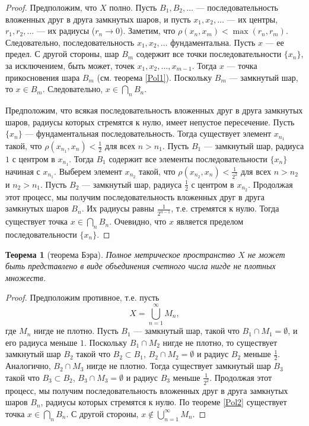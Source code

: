 \documentclass[12pt, titlepage, oneside]{amsbook}
\newtheorem{theorem}{Теорема}[chapter]
\theoremstyle{definition}
\theoremstyle{remark}
\begin{document}
\begin{proof}
Предположим, что $X$ полно. Пусть $B_1, B_2,\ldots$ --- последовательность вложенных друг в друга замкнутых шаров, и пусть $x_1,x_2,\ldots$ --- их центры, $r_1,r_2,\ldots$ --- их радиусы ($r_n\rightarrow 0$). Заметим, что $\rho(x_n,x_m)<\max(r_n,r_m)$. Следовательно, последовательность $x_1,x_2,\ldots$ фундаментальна. Пусть $x$ --- ее предел. С другой стороны, шар $B_m$ содержит все точки последовательности $\{x_n\}$, за исключением, быть может, точек $x_1,x_2,\ldots,x_{m-1}$. Тогда $x$ --- точка прикосновения шара $B_m$ (см. теорема \ref{Pol1}). Поскольку $B_m$ --- замкнутый шар, то $x\in B_m$. Следовательно, $x\in\bigcap\limits_n B_n$.

Предположим, что всякая последовательность вложенных друг в друга замкнутых шаров, радиусы которых стремятся к нулю, имеет непустое пересечение. Пусть $\{x_n\}$ --- фундаментальная последовательность. Тогда существует элемент $x_{n_1}$ такой, что $\rho(x_{n_1}, x_n)<\frac{1}{2}$ для всех $n>n_1$. Пусть $B_1$ --- замкнутый шар, радиуса $1$ с центром в $x_{n_1}$. Тогда $B_1$ содержит все элементы последовательности $\{x_n\}$ начиная с $x_{n_1}$. Выберем элемент $x_{n_2}$ такой, что $\rho(x_{n_2}, x_n)<\frac{1}{2^2}$ для всех $n>n_2$ и $n_2>n_1$. Пусть $B_2$ --- замкнутый шар, радиуса $\frac{1}{2}$ с центром в $x_{n_2}$. Продолжая этот процесс, мы получим последовательность вложенных друг в друга замкнутых шаров $B_n$. Их радиусы равны $\frac{1}{2^{n-1}}$, т.е. стремятся к нулю. Тогда существует точка $x\in\bigcap\limits_n B_n$. Очевидно, что $x$ является пределом последовательности $\{x_n\}$.
\end{proof}

 \begin{theorem}[теорема Бэра]
\label{Pol3}
Полное метрическое пространство $X$ не может быть представлено в виде объединения счетного числа нигде не плотных множеств.
\end{theorem}

\begin{proof}
Предположим противное, т.е. пусть $$X=\bigcup\limits_{n=1}^{\infty}M_n,$$ где $M_n$ нигде не плотно. Пусть $B_1$ --- замкнутый шар, такой что $B_1\cap M_1=\emptyset$, и его радиуса меньше $1$. Поскольку $B_1\cap M_2$ нигде не плотно, то существует замкнутый шар $B_2$  такой что $B_2\subset B_1$, $B_2\cap M_2=\emptyset$ и радиус $B_2$ меньше $\frac{1}{2}$. Аналогично, $B_2\cap M_3$ нигде не плотно. Тогда существует замкнутый шар $B_3$  такой что $B_3\subset B_2$, $B_3\cap M_3=\emptyset$ и радиус $B_3$ меньше $\frac{1}{2^2}$. Продолжая этот процесс, мы получим последовательность вложенных друг в друга замкнутых шаров $B_n$, радиусы которых стремятся к нулю. По теореме \ref{Pol2} существует точка $x\in\bigcap\limits_n B_n$. С другой стороны, $x\not\in\bigcup\limits_{n=1}^{\infty}M_n$.
\end{proof}
\end{document}
